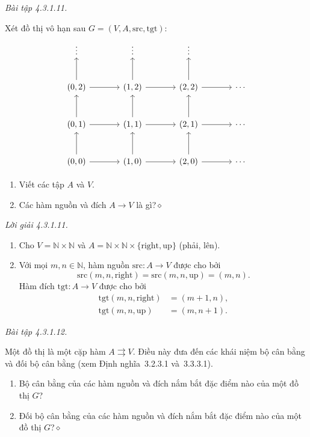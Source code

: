 \noindent\textit{Bài tập 4.3.1.11.}\keepwithnext

Xét đồ thị vô hạn sau $G=(V,A,\mathrm{src},\mathrm{tgt})$:
\[
\begin{tikzcd}[column sep=large,row sep=large]
\vdots&\vdots&\vdots&\\
(0,2)\arrow[u]\arrow[r]&(1,2)\arrow[u]\arrow[r]&(2,2)\arrow[u]\arrow[r]&\cdots\\
(0,1)\arrow[u]\arrow[r]&(1,1)\arrow[u]\arrow[r]&(2,1)\arrow[u]\arrow[r]&\cdots\\
(0,0)\arrow[u]\arrow[r]&(1,0)\arrow[u]\arrow[r]&(2,0)\arrow[u]\arrow[r]&\cdots
\end{tikzcd}
\]
\begin{enumerate}[label=\alph*.]
\item Viết các tập $A$ và $V$.
\item Các hàm nguồn và đích $A\to V$ là gì?\nobreak\hfill$\diamond$
\end{enumerate}

\noindent\textit{Lời giải 4.3.1.11.}\keepwithnext
\begin{enumerate}[label=\alph*.]
\item Cho $V=\mathbb{N}\times\mathbb{N}$ và $A=\mathbb{N}\times\mathbb{N}\times\{\mathrm{right},\mathrm{up}\}$ (phải, lên).
\item Với mọi $m,n\in\mathbb{N}$, hàm nguồn $\mathrm{src}:A\to V$ được cho bởi
\[
\mathrm{src}(m,n,\mathrm{right})=\mathrm{src}(m,n,\mathrm{up})=(m,n).
\]
Hàm đích $\mathrm{tgt}:A\to V$ được cho bởi
\begin{align*}
\mathrm{tgt}(m,n,\mathrm{right})&=(m+1,n),\\
\mathrm{tgt}(m,n,\mathrm{up})&=(m,n+1).
\tag*{$\blacklozenge$}
\end{align*}
\end{enumerate}

\noindent\textit{Bài tập 4.3.1.12.}\keepwithnext

Một đồ thị là một cặp hàm $A\rightrightarrows V$. Điều này đưa đến các khái niệm bộ cân bằng và đối bộ cân bằng (xem Định nghĩa~3.2.3.1 và~3.3.3.1).
\begin{enumerate}[label=\alph*.]
\item Bộ cân bằng của các hàm nguồn và đích nắm bắt đặc điểm nào của một đồ thị $G$?
\item Đối bộ cân bằng của các hàm nguồn và đích nắm bắt đặc điểm nào của một đồ thị $G$?\nobreak\hfill$\diamond$
\end{enumerate}


